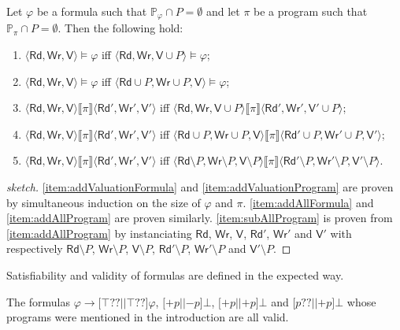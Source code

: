 \documentclass{llncs}
\newcommand{\pll}{ {||} }							%
\newcommand{\readset}{\mathsf{Rd}}
\newcommand{\valuset}{\mathsf{V}}
\newcommand{\writeset}{\mathsf{Wr}}
\newcommand{\testendo}{?\!\!?}			%
\newcommand{\assgntopV}[1]{{\mathtt {+} #1}}
\newcommand{\assgnbotV}[1]{{\mathtt {-} #1}}
\newcommand{\intPgm}[1]{\llbracket #1 \rrbracket}
\newcommand{\lbox}[1]{ \big[ #1 \big] }
\newcommand{\limp}{ \rightarrow }
\renewcommand{\phi}{\varphi}
\newcommand{\propset}{\mathbb P}
\newcommand{\propsetOf}[1]{\propset_{#1}}
\newcommand{\tuple}[1]{ \langle #1 \rangle}
\begin{document}
\begin{lemma}\label{theo:irrelevantVariables}
Let $\phi$ be a formula such that $\propsetOf \phi \cap P = \emptyset$ and
let $ \pi$ be a program such that $\propsetOf \pi \cap P = \emptyset$. Then the following hold:
\begin{enumerate}
\item\label{item:addValuationFormula}
$\tuple{\readset,\writeset,\valuset} \models \phi $ iff
$\tuple{\readset,\writeset,\valuset\cup P} \models \phi$;
\item\label{item:addAllFormula}
$\tuple{\readset,\writeset,\valuset} \models \phi $ iff
$\tuple{\readset\cup P,\writeset\cup P,\valuset} \models \phi$;
\item\label{item:addValuationProgram}
$\tuple{\readset,\writeset,\valuset} \intPgm \pi \tuple{\readset',\writeset',\valuset'} $ iff
$\tuple{\readset,\writeset,\valuset\cup P} \intPgm \pi \tuple{\readset',\writeset',\valuset'\cup P} $;
\item\label{item:addAllProgram}
$\tuple{\readset,\writeset,\valuset} \intPgm \pi \tuple{\readset',\writeset',\valuset'} $ iff
$\tuple{\readset\cup P,\writeset\cup P,\valuset} \intPgm \pi \tuple{\readset'\cup P,\writeset'\cup P,\valuset'} $;
\item\label{item:subAllProgram}
$\tuple{\readset,\writeset,\valuset} \intPgm \pi \tuple{\readset',\writeset',\valuset'} $ iff
$\tuple{\readset\setminus P,\writeset\setminus P,\valuset\setminus P} \intPgm \pi \tuple{\readset'\setminus P,\writeset'\setminus P,\valuset'\setminus P} $.
\end{enumerate}
\end{lemma}
\begin{proof}[sketch]
\ref{item:addValuationFormula} and \ref{item:addValuationProgram} are proven by simultaneous
induction on the size of $\phi$ and $\pi$.
\ref{item:addAllFormula} and \ref{item:addAllProgram} are proven similarly.
\ref{item:subAllProgram} is proven from \ref{item:addAllProgram} by instanciating $\readset$,
$\writeset$, $\valuset$, $\readset'$, $\writeset'$ and $\valuset'$ with respectively
$\readset\setminus P$, $\writeset\setminus P$, $\valuset\setminus P$, $\readset'\setminus P$,
$\writeset'\setminus P$ and $\valuset'\setminus P$.
\end{proof}


Satisfiability and validity of formulas are defined in the expected way.

\begin{example}
The formulas 
$\phi \limp \lbox{ \top \testendo \pll \top \testendo } \phi$, 
$\lbox{ \assgntopV p \pll \assgnbotV p } \bot$,
$\lbox{ \assgntopV p \pll \assgntopV p } \bot$ and 
$\lbox{ p \testendo \pll \assgntopV p } \bot$ 
whose programs were mentioned in the introduction are all valid. 
\end{example}
\end{document}
